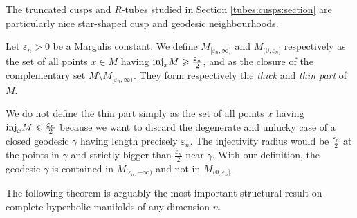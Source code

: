 The truncated cusps and $R$-tubes studied in Section \ref{tubes:cusps:section} are particularly nice star-shaped cusp and geodesic neighbourhoods. 

Let $\varepsilon_n>0$ be a Margulis constant. We define $M_{[\varepsilon_n,\infty)}$ and $M_{(0,\varepsilon_n]}$ respectively as the set of all points $x \in M$ having ${\rm inj}_x M \geqslant \frac{\varepsilon_n}2$, and as the closure of the complementary set $M\setminus M_{[\varepsilon_n,\infty)}$. They form respectively the \emph{thick} and \emph{thin part} of $M$. 

\begin{oss} \label{exclude:thin:oss}
We do not define the thin part simply as the set of all points $x$ having ${\rm inj}_x M \leqslant \frac{\varepsilon_n}2$ because we want to discard the degenerate and unlucky case of a closed geodesic $\gamma$ having length precisely $\varepsilon_n$. The injectivity radius would be $\frac{\varepsilon_n}2$ at the points in $\gamma$ and strictly bigger than $\frac{\varepsilon_n}2$ near $\gamma$. With our definition, the geodesic $\gamma $ is contained in $M_{[\varepsilon_n, +\infty)}$ and not in $M_{(0,\varepsilon_n]}$.
\end{oss}

The following theorem is arguably the most important structural result on complete hyperbolic manifolds of any dimension $n$.

